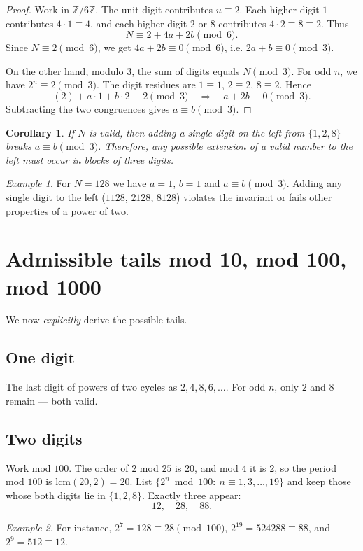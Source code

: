 \documentclass[12pt]{article}
\theoremstyle{plain}
\newtheorem{corollary}{Corollary}
\theoremstyle{remark}
\newtheorem*{example}{Example}
\begin{document}
\begin{proof}
Work in $\mathbb Z/6\mathbb Z$.  
The unit digit contributes $u\equiv2$.  
Each higher digit $1$ contributes $4\cdot1\equiv4$, and each higher digit $2$ or $8$ contributes $4\cdot2\equiv8\equiv2$.  
Thus
\[
N\equiv 2 + 4a + 2b \pmod6.
\]
Since $N\equiv2\pmod6$, we get $4a+2b\equiv0\pmod6$, i.e. $2a+b\equiv0\pmod3$.

On the other hand, modulo $3$, the sum of digits equals $N\pmod3$.  
For odd $n$, we have $2^n\equiv2\pmod3$.  
The digit residues are $1\equiv1$, $2\equiv2$, $8\equiv2$. Hence
\[
(2) + a\cdot1 + b\cdot2 \equiv 2 \pmod3 \quad\Rightarrow\quad a+2b\equiv0\pmod3.
\]
Subtracting the two congruences gives $a\equiv b\pmod3$.
\end{proof}

\begin{corollary}\label{cor:blocks}
If $N$ is valid, then adding a single digit on the left from $\{1,2,8\}$ breaks $a\equiv b\pmod3$.  
Therefore, any possible extension of a valid number to the left must occur in blocks of three digits.
\end{corollary}

\begin{example}
For $N=128$ we have $a=1$, $b=1$ and $a\equiv b\pmod3$.  
Adding any single digit to the left ($1128$, $2128$, $8128$) violates the invariant or fails other properties of a power of two.
\end{example}

\section{Admissible tails mod 10, mod 100, mod 1000}
We now \emph{explicitly} derive the possible tails.

\subsection*{One digit}
The last digit of powers of two cycles as $2,4,8,6,\ldots$.  
For odd $n$, only $2$ and $8$ remain — both valid.

\subsection*{Two digits}
Work mod $100$.  
The order of $2$ mod $25$ is $20$, and mod $4$ it is $2$, so the period mod $100$ is $\mathrm{lcm}(20,2)=20$.  
List $\{2^n\bmod100:\ n\equiv1,3,\ldots,19\}$ and keep those whose both digits lie in $\{1,2,8\}$.  
Exactly three appear:
\begin{equation}\label{eq:tails2}
\boxed{12,\quad 28,\quad 88.}
\end{equation}
\begin{example}
For instance, $2^7=128\equiv 28\pmod{100}$, $2^{19}=524288\equiv88$, and $2^9=512\equiv12$.
\end{example}
\end{document}

